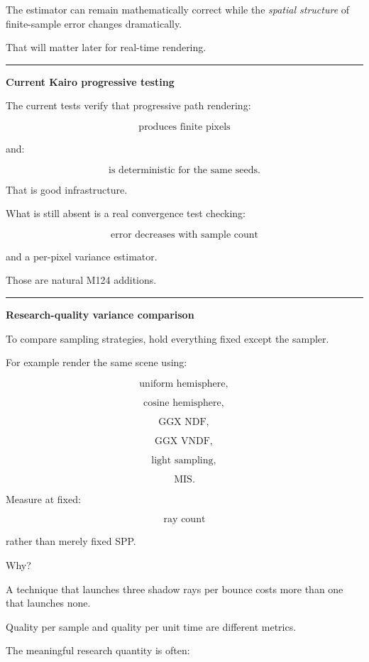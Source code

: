 The estimator can remain mathematically correct while the \emph{spatial structure} of finite-sample error changes dramatically.

That will matter later for real-time rendering.

\begin{center}\rule{0.5\linewidth}{0.5pt}\end{center}

\textbf{Current Kairo progressive testing}

The current tests verify that progressive path rendering:

\[
\text{produces finite pixels}
\]

and:

\[
\text{is deterministic for the same seeds}.
\]

That is good infrastructure.

What is still absent is a real convergence test checking:

\[
\text{error decreases with sample count}
\]

and a per-pixel variance estimator.

Those are natural M124 additions.

\begin{center}\rule{0.5\linewidth}{0.5pt}\end{center}

\textbf{Research-quality variance comparison}

To compare sampling strategies, hold everything fixed except the sampler.

For example render the same scene using:

\[
\text{uniform hemisphere},
\]

\[
\text{cosine hemisphere},
\]

\[
\text{GGX NDF},
\]

\[
\text{GGX VNDF},
\]

\[
\text{light sampling},
\]

\[
\text{MIS}.
\]

Measure at fixed:

\[
\text{ray count}
\]

rather than merely fixed SPP.

Why?

A technique that launches three shadow rays per bounce costs more than one that launches none.

Quality per sample and quality per unit time are different metrics.

The meaningful research quantity is often:

